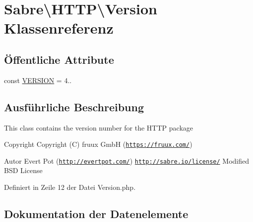 \hypertarget{class_sabre_1_1_h_t_t_p_1_1_version}{}\section{Sabre\textbackslash{}H\+T\+TP\textbackslash{}Version Klassenreferenz}
\label{class_sabre_1_1_h_t_t_p_1_1_version}
\subsection*{Öffentliche Attribute}
\begin{DoxyCompactItemize}
\item 
const \mbox{\hyperlink{class_sabre_1_1_h_t_t_p_1_1_version_ad68e38b135ba024d5b8a2fa96594a39b}{V\+E\+R\+S\+I\+ON}} = \textquotesingle{}4..\textquotesingle{}
\end{DoxyCompactItemize}


\subsection{Ausführliche Beschreibung}
This class contains the version number for the H\+T\+TP package

\begin{DoxyCopyright}{Copyright}
Copyright (C) fruux GmbH (\href{https://fruux.com/}{\tt https\+://fruux.\+com/}) 
\end{DoxyCopyright}
\begin{DoxyAuthor}{Autor}
Evert Pot (\href{http://evertpot.com/}{\tt http\+://evertpot.\+com/})  \href{http://sabre.io/license/}{\tt http\+://sabre.\+io/license/} Modified B\+SD License 
\end{DoxyAuthor}


Definiert in Zeile 12 der Datei Version.\+php.



\subsection{Dokumentation der Datenelemente}
\mbox{\label{class_sabre_1_1_h_t_t_p_1_1_version_ad68e38b135ba024d5b8a2fa96594a39b}} 
